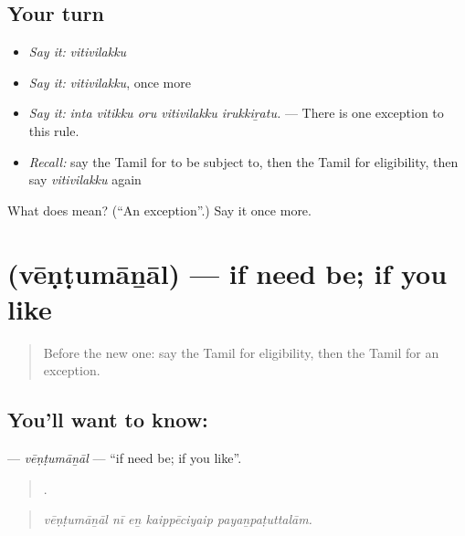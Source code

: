 \subsection*{Your turn}
\begin{itemize}
\raggedright
  \item \emph{Say it:} \emph{vitivilakku}
  \item \emph{Say it:} \emph{vitivilakku}, once more
  \item \emph{Say it:} \emph{inta vitikku oru vitivilakku irukkiṟatu.} — There is one exception to this rule.
  \item \emph{Recall:} say the Tamil for to be subject to, then the Tamil for eligibility, then say \emph{vitivilakku} again
\end{itemize}

\begin{tcolorbox}[breakable,colback=teal!4,colframe=teal!35!black,title={Before you move on}]
What does  mean? (\textquotedblleft{}An exception\textquotedblright{}.) Say it once more.
\end{tcolorbox}
\section[\texorpdfstring{\ta{வேண்டுமானால்} (vēṇṭumāṉāl)}{வேண்டுமானால் (vēṇṭumāṉāl)}]{ (vēṇṭumāṉāl) — if need be; if you like}

\label{lesson:TA-C382-ventumanal}



\begin{quote}
Before the new one: say the Tamil for eligibility, then the Tamil for an exception.
\end{quote}

\subsection*{You'll want to know: }
\textbf{} — \emph{vēṇṭumāṉāl} — \textquotedblleft{}if need be; if you like\textquotedblright{}.

\begin{quote}
    .
\end{quote}

\begin{quote}
\emph{vēṇṭumāṉāl nī eṉ kaippēciyaip payaṉpaṭuttalām.}
\end{quote}

